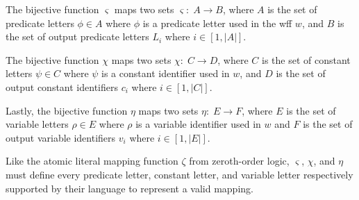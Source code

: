 \documentclass[ms]{uncgdissertationexp2}
\theoremstyle{plain}
\theoremstyle{definition}
\theoremstyle{remark}
\begin{document}
The bijective function $\varsigma$ maps two sets $\varsigma:\;A \to B$, where $A$ is the set of predicate letters $\phi \in A$ where $\phi$ is a predicate letter used in the wff $w$, and $B$ is the set of output predicate letters $L_{i}$ where $i \in [1, |A|]$.

The bijective function $\chi$ maps two sets $\chi:\;C \to D$, where $C$ is the set of constant letters $\psi \in C$ where $\psi$ is a constant identifier used in $w$, and $D$ is the set of output constant identifiers $c_{i}$ where $i \in [1, |C|]$.

Lastly, the bijective function $\eta$ maps two sets $\eta:\;E \to F$, where $E$ is the set of variable letters $\rho \in E$ where $\rho$ is a variable identifier used in $w$ and $F$ is the set of output variable identifiers $v_{i}$ where $i \in [1, |E|]$.

Like the atomic literal mapping function $\zeta$ from zeroth-order logic, $\varsigma$, $\chi$, and $\eta$ must define every predicate letter, constant letter, and variable letter respectively supported by their language to represent a valid mapping.
\end{document}
